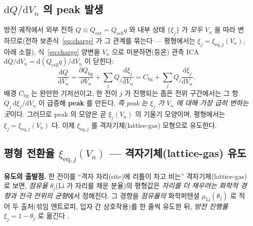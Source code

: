 \documentclass[11pt,a4paper]{article}
\newcommand{\dd}{\mathrm{d}}
\newcommand{\eq}{\mathrm{eq}}
\newcommand{\cell}{\mathrm{cell}}
\newcommand{\bg}{\mathrm{bg}}
\newcommand{\ext}{\mathrm{ext}}
\begin{document}
\subsection{$\dd Q/\dd V_n$ 의 peak 발생}
방전 궤적에서 외부 전하 $Q\equiv Q_\ext=Q_\cell q$ 와 내부 상태 $\{\xi_j\}$ 가 \emph{모두} $V_n$ 을 따라 변하므로(전하
보존식~\eqref{eq:charge} 가 그 관계를 묶는다 — 평형에서는 $\xi_j=\xi_{\eq,j}(V_n)$, 아래 소절), 식~\eqref{eq:charge}
양변을 $V_n$ 으로 미분하면(등온) 관측 ICA $\dd Q/\dd V_n=\dd(Q_\cell q)/\dd V_n$ 이 닫힌다:
\begin{equation}
\frac{\dd Q}{\dd V_n}=\frac{\partial Q_\bg}{\partial V_n}+\sum_j Q_j\frac{\dd\xi_j}{\dd V_n}
=C_\bg+\sum_j Q_j\frac{\dd\xi_j}{\dd V_n}.
\label{eq:dQdV}
\end{equation}
배경 $C_\bg$ 는 완만한 기저선이고, 한 전이 $j$ 가 진행되는 좁은 전위 구간에서는 그 항 $Q_j\,\dd\xi_j/\dd V_n$ 이
급증해 \textbf{peak} 를 만든다. \emph{즉 peak 는 $\xi_j$ 가 $V_n$ 에 대해 가장 급히 변하는 곳}이다. 그러므로
peak 의 모양은 곧 $\xi_j(V_n)$ 의 기울기 모양이며, 평형에서는 $\xi_j=\xi_{\eq,j}(V_n)$ 다. 이제 $\xi_{\eq,j}$ 를
격자기체(lattice-gas) 모형으로 유도한다.

\subsection{평형 전환율 $\xi_{\eq,j}(V_n)$ — 격자기체(lattice-gas) 유도}
\textbf{유도의 출발점.} 한 전이를 ``격자 자리(site)에 리튬이 차고 비는'' 격자기체(lattice-gas)로 보면, \emph{점유율}
$\theta_j$(Li 가 자리를 채운 분율)의 평형값은 \emph{자리를 더 채우려는 화학적 경향과 전극 전위의 균형}에서 정해진다.
그 경향을 \emph{점유율의} 화학퍼텐셜 $\mu_\mathrm{Li}(\theta_j)$ 로 적어 두 출처(섞임 엔트로피, 입자 간 상호작용)를 한
줄씩 유도한 뒤, \emph{방전 진행률} $\xi_j=1-\theta_j$ 로 옮긴다 \cite{mckinnon1983,bazant2013}.
\end{document}
